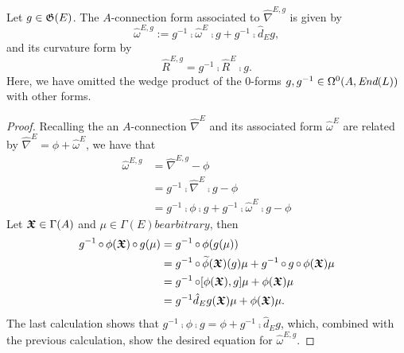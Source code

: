 \begin{proposition}
Let $g \in \mathfrak{G}(E)$. The $A$-connection form associated to $\hat \nabla^{E, g}$ is given by
\begin{equation*}
    \hat \omega^{E, g}  := g^{-1} \comp \hat \omega^E \comp g + g^{-1} \comp \hat d_E g,
\end{equation*}
and its curvature form by
\begin{equation*}
    \hat R^{E, g} = g^{-1} \comp  \hat R^E \comp g.
\end{equation*}
Here, we have omitted the wedge product of the $0$-forms $g, g^{-1} \in \Omega^0(A, \operatorname{\textit{End}}(L))$ with other forms.
\end{proposition}
\begin{proof}
Recalling the an $A$-connection $\hat \nabla^E$ and its associated form $\hat \omega^E$ are related by $\hat \nabla^E = \phi + \hat \omega^E$, we have that
\begin{align*}
    \hat \omega^{E, g} &= \hat \nabla^{E, g} - \phi \\
        &= g^{-1} \comp \hat \nabla^E \comp g  - \phi\\
        &= g^{-1} \comp \phi \comp g + g^{-1} \comp  \hat \omega^E \comp g  - \phi
\end{align*}
Let $\bm{\mathfrak{X}} \in \Gamma(A)$ and $\mu \in \Gamma(E) be arbitrary$, then
\begin{align*}
    g^{-1} \comp \phi(\sectoid X) \comp g (\mu) 
        &= g^{-1} \comp \phi (g(\mu)) \\
        &= g^{-1}\comp \tilde \phi(\sectoid X)(g)\mu + g^{-1} \comp g \comp \phi(\sectoid X)\mu\\
        &= g^{-1} \comp [\phi(\sectoid X), g]\mu + \phi(\sectoid X) \mu\\
        &= g^{-1} \hat d_E g(\sectoid X) \mu + \phi(\sectoid X) \mu.
\end{align*}
The last calculation shows that $g^{-1} \comp \phi \comp g = \phi + g^{-1} \comp \hat d_E g$, which, combined with the previous calculation, show the desired equation for $\hat \omega^{E, g}$.

\end{proof}

